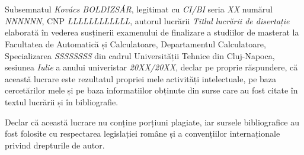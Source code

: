 \documentclass[12pt,a4paper,twoside,openright]{report}
\renewcommand{\thesisauthor}{Kovács BOLDIZSÁR}    %
\renewcommand{\thesismonth}{Iulie}     %
\renewcommand{\thesistitle}{Titlul lucrării de disertație}
\begin{document}
\begin{titlepage}
\phantom{1}
\end{titlepage}



\begin{titlepage}

\begin{center}
\thispagestyle{firststylewithfooter}


{\scshape \facultynameromanian} \\
{\scshape \departmentnameromanian} \\
\end{center}

\vspace{3cm}

\begin{center}
\autheticitydeclarationsize \textbf{\autheticitydeclarationromanian}
\end{center}

\vspace{1cm}

Subsemnatul \textit{\thesisauthor}, legitimat cu \textit{CI/BI} seria \textit{XX} numărul \textit{NNNNNN}, CNP \textit{LLLLLLLLLLLL}, autorul lucrării \textit{\thesistitle} elaborată în vederea susținerii examenului de finalizare a studiilor de masterat la Facultatea de Automatică și Calculatoare, Departamentul Calculatoare, Specializarea \textit{SSSSSSSS} din cadrul Universității Tehnice din Cluj-Napoca, sesiunea \textit{\thesismonth} a anului univeristar \textit{20XX/20XX}, declar pe proprie răspundere, că această lucrare este rezultatul propriei mele activități intelectuale, pe baza cercetărilor mele și pe baza informatiilor obținute din surse care au fost citate în textul lucrării și în bibliografie.

Declar că această lucrare nu conține porțiuni plagiate, iar sursele bibliografice au fost folosite cu respectarea legislației române și a convențiilor internaționale privind drepturile de autor.


\end{titlepage}
\end{document}
